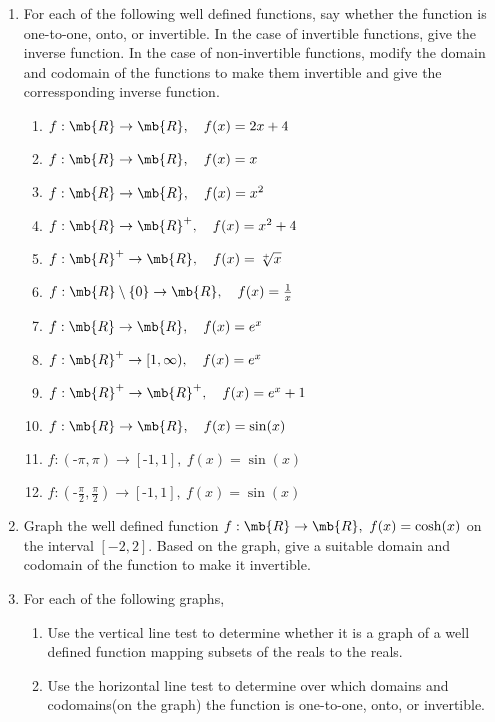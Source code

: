\begin{enumerate}
\item
  For each of the following well defined functions, say whether the function is one-to-one, onto, or invertible. In the case of invertible functions, give the inverse function. In the case of non-invertible functions, modify the domain and codomain of the functions to make them invertible and give the corressponding inverse function.
  \begin{multicols}{2}
    \begin{enumerate}
    \item $f: \mb{R} \to \mb{R},\quad f(x)=2x+4$
    \item $f: \mb{R} \to \mb{R},\quad f(x)=x$
    \item $f: \mb{R} \to \mb{R},\quad f(x)=x^2$
    \item $f: \mb{R} \to \mb{R}^+,\quad f(x)=x^2+4$
    \item $f: \mb{R}^+ \to \mb{R},\quad f(x)=\sqrt[+]{x}$
    \item $f: \mb{R}\setminus\{0\} \to \mb{R},\quad f(x)=\frac{1}{x}$
    \item $f: \mb{R} \to \mb{R},\quad f(x)=e^x$
    \item $f: \mb{R}^+ \to [1,\infty),\quad f(x)=e^x$
    \item $f: \mb{R}^+ \to \mb{R}^+,\quad f(x)=e^x+1$
    \item $f: \mb{R} \to \mb{R},\quad f(x)=\sin(x)$
    \item $f: (\text{-}\pi,\pi) \to [\text{-}1,1],\  f(x)=\sin(x)$
    \item $f: (\text{-}\frac{\pi}{2},\frac{\pi}{2}) \to [\text{-}1,1],\  f(x)=\sin(x)$
    \end{enumerate}
  \end{multicols}

\item
  Graph the well defined function $f: \mb{R} \to \mb{R}, \ f(x)=\cosh(x)$ on the interval $[-2,2]$. Based on the graph, give a suitable domain and codomain of the function to make it invertible.

\pagebreak

\item For each of the following graphs,
  \begin{enumerate}
    \item  Use the vertical line test to determine whether it is a graph of a well defined function mapping subsets of the reals to the reals.
    \item  Use the horizontal line test to determine over which domains and codomains(on the graph) the function is one-to-one, onto, or invertible.
  \end{enumerate}



\end{enumerate}
